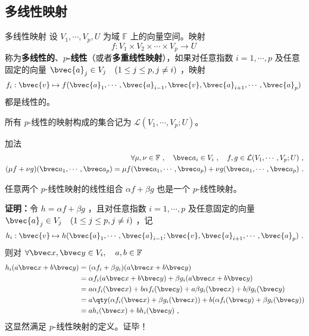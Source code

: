 

\subsection{多线性映射}
\begin{definition}{多线性映射}
设 $V_1,\cdots,V_p, U$ 为域 $\mathbb{F}$ 上的向量空间。映射
\begin{equation}
f:V_1\times V_2\times\cdots\times V_p\rightarrow U~
\end{equation}
称为\textbf{多线性的}、\textbf{$p$-线性}（或者\textbf{多重线性映射}），如果对任意指数 $i=1,\cdots,p$ 及任意固定的向量 $\bvec{a}_j \in V_j\quad(1 \leq j \leq p,j\neq i)$ ，映射
\begin{equation}
f_i:\bvec{v}\mapsto f(\bvec{a}_1, \cdots, \bvec{a}_{i-1}, \bvec{v},\bvec{a}_{i+1}, \cdots,\bvec{a}_p)~
\end{equation}
都是线性的。
\end{definition}
所有 $p$-线性的映射构成的集合记为 $\mathcal{L}(V_1,\cdots,V_p;U)$。

\begin{definition}{加法}
\begin{equation}
\begin{aligned}
\forall \mu,\nu\in\mathbb{F}~,\quad\bvec a_i\in V_i~,\quad f,g\in \mathcal{L}(V_1,\cdots,V_p;U)~,\\
(\mu f+\nu g)(\bvec a_1,\cdots,\bvec a_p)=\mu f(\bvec a_1,\cdots,\bvec a_p)+\nu g(\bvec a_1,\cdots,\bvec a_p)~.
\end{aligned}
\end{equation}
\end{definition}
\begin{theorem}{}\label{the_MulMap_1}
任意两个 $p$-线性映射的线性组合 $\alpha f+\beta g$ 也是一个 $p$-线性映射。
\end{theorem}
\textbf{证明：}令 $h=\alpha f+\beta g$ ，且对任意指数 $i=1,\cdots,p$ 及任意固定的向量 $\bvec{a}_j \in V_j\quad(1\leq j\leq p,j\neq i)$ ，记
\begin{equation}
h_i:\bvec{v}\mapsto h(\bvec{a}_1,\cdots,\bvec{a}_{i-1};\bvec{v},\bvec{a}_{i+1},\cdots,\bvec{a}_p)~.
\end{equation}
则对 $\forall \bvec x,\bvec y\in V_i,\quad a,b\in\mathbb{F}$
\begin{equation}
\begin{aligned}
h_i(a \bvec x+b\bvec y)&=(\alpha f_i+\beta g_i)(a \bvec x+b\bvec y)\\
&=\alpha f_i(a \bvec x+b\bvec y)+\beta g_i(a \bvec x+b\bvec y)\\
&=a\alpha f_i(\bvec x)+b\alpha f_i(\bvec y)+a\beta g_i(\bvec x)+b\beta g_i(\bvec y)\\
&=a\qty(\alpha f_i(\bvec x)+\beta g_i(\bvec x))+b(\alpha f_i(\bvec y)+\beta g_i(\bvec y))\\
&=ah_i(\bvec x)+bh_i(\bvec y)~,
\end{aligned}
\end{equation}
这显然满足 $p$-线性映射的定义。证毕！

